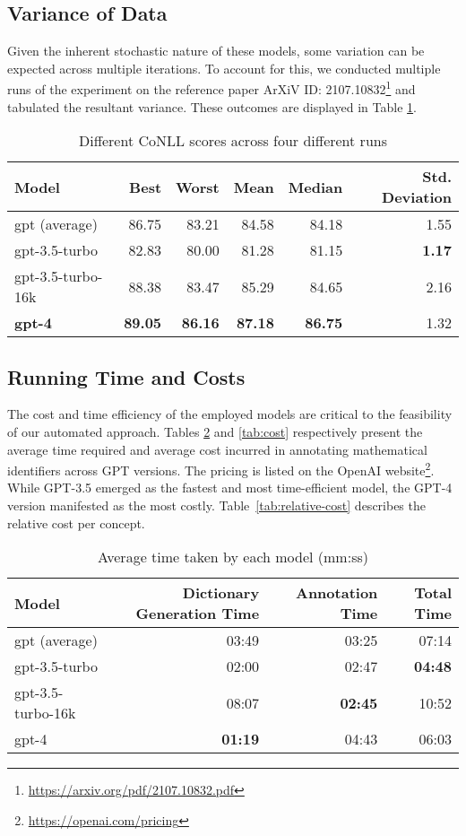 \subsection{Variance of Data}
Given the inherent stochastic nature of these models, some variation can be expected across multiple iterations. To account for this, we conducted multiple runs of the experiment on the reference paper ArXiV ID: 2107.10832\footnote{\url{https://arxiv.org/pdf/2107.10832.pdf}} \citep{singleton2021logic} and tabulated the resultant variance. These outcomes are displayed in Table \ref{tab:variance}.

\begin{table}[htpb]
  \centering
  \begin{tabular}{lrrrrr}
    \hline
    Model & Best & Worst & Mean & Median & Std. Deviation \\
    \hline
    gpt (average) & 86.75 & 83.21 & 84.58 & 84.18 & 1.55 \\
    gpt-3.5-turbo & 82.83 & 80.00 & 81.28 & 81.15 & \textbf{1.17} \\
    gpt-3.5-turbo-16k & 88.38 & 83.47 & 85.29 & 84.65 & 2.16 \\
    \textbf{gpt-4} & \textbf{89.05} & \textbf{86.16} & \textbf{87.18} & \textbf{86.75} & 1.32 \\
    \hline
  \end{tabular}
  \caption[Statistics of variance]{Different CoNLL scores across four different runs}
  \label{tab:variance}
\end{table}

\subsection{Running Time and Costs}

The cost and time efficiency of the employed models are critical to the feasibility of our automated approach. Tables \ref{tab:time} and \ref{tab:cost} respectively present the average time required and average cost incurred in annotating mathematical identifiers across GPT versions. The pricing is listed on the OpenAI website\footnote{\url{https://openai.com/pricing}}. While GPT-3.5 emerged as the fastest and most time-efficient model, the GPT-4 version manifested as the most costly. Table~\ref{tab:relative-cost} describes the relative cost per concept.

\begin{table}[htpb]
  \centering
  \begin{tabular}{lrrr}
    \hline
    Model & Dictionary Generation Time & Annotation Time & Total Time \\
    \hline
    gpt (average) & 03:49 & 03:25 & 07:14 \\
    gpt-3.5-turbo & 02:00 & 02:47 & \textbf{04:48} \\
    gpt-3.5-turbo-16k & 08:07 & \textbf{02:45} & 10:52 \\
    gpt-4 & \textbf{01:19} & 04:43 & 06:03 \\
    \hline
  \end{tabular}
  \caption[Average time taken]{Average time taken by each model (mm:ss)}
  \label{tab:time}
\end{table}


